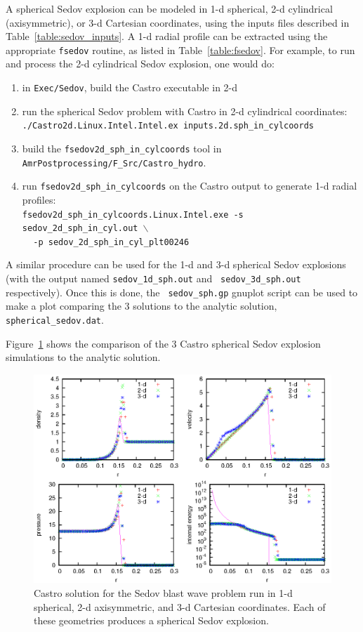 A spherical Sedov explosion can be modeled in 1-d spherical, 2-d
cylindrical (axisymmetric), or 3-d Cartesian coordinates, using the
inputs files described in Table~\ref{table:sedov_inputs}.  A 1-d radial
profile can be extracted using the appropriate {\tt fsedov} routine,
as listed in Table~\ref{table:fsedov}.  For example, to run and process
the 2-d cylindrical Sedov explosion, one would do:
\begin{enumerate}
\item in {\tt Exec/Sedov}, build the Castro executable in 2-d
\item run the spherical Sedov problem with Castro in 2-d cylindrical coordinates: \\
 {\tt ./Castro2d.Linux.Intel.Intel.ex inputs.2d.sph\_in\_cylcoords} 
\item build the {\tt fsedov2d\_sph\_in\_cylcoords} tool in 
{\tt AmrPostprocessing/F\_Src/Castro\_hydro}.  
\item run {\tt fsedov2d\_sph\_in\_cylcoords} on the Castro output to generate 1-d radial
 profiles: \\
 {\tt fsedov2d\_sph\_in\_cylcoords.Linux.Intel.exe -s sedov\_2d\_sph\_in\_cyl.out $\mathtt{\backslash}$ } \\
 $~~~~~${\tt -p sedov\_2d\_sph\_in\_cyl\_plt00246} 
\end{enumerate}
A similar procedure can be used for the 1-d and 3-d spherical Sedov
explosions (with the output named {\tt sedov\_1d\_sph.out} and {\tt
  sedov\_3d\_sph.out} respectively).  Once this is done, the {\tt
  sedov\_sph.gp} gnuplot script can be used to make a plot comparing
the 3 solutions to the analytic solution, {\tt spherical\_sedov.dat}.

Figure~\ref{fig:sedov_sph} shows the comparison of the 3 Castro
spherical Sedov explosion simulations to the analytic solution.

\begin{figure}[t]
\centering
\includegraphics[width=5.0in]{CastroVerification/sedov_sph}
\caption{\label{fig:sedov_sph} Castro solution for the Sedov blast wave problem
  run in 1-d spherical, 2-d axisymmetric, and 3-d Cartesian coordinates.
  Each of these geometries produces a spherical Sedov explosion.}
\end{figure}


